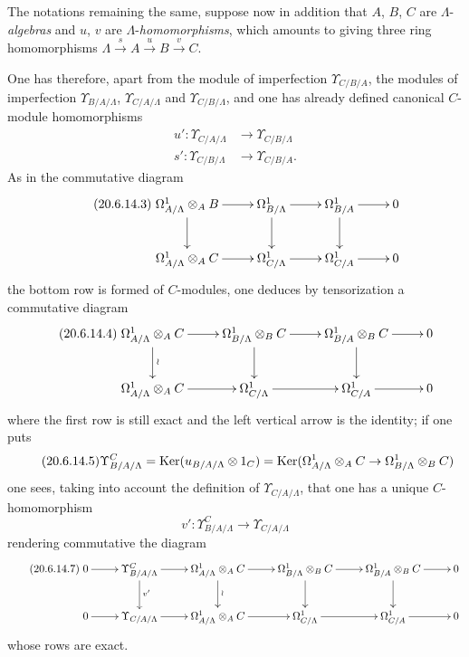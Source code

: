 \begin{env}[20.6.14]
\label{0.20.6.14}
The notations remaining the same, suppose now in addition that $A$, $B$, $C$ are $\Lambda$-\emph{algebras} and $u$, $v$ are $\Lambda$-\emph{homomorphisms}, which amounts to giving three ring homomorphisms $\Lambda\xrightarrow{s}A\xrightarrow{u}B\xrightarrow{v}C$.

One has therefore, apart from the module of imperfection $\Upsilon_{C/B/A}$, the modules of imperfection $\Upsilon_{B/A/\Lambda}$, $\Upsilon_{C/A/\Lambda}$ and $\Upsilon_{C/B/\Lambda}$, and one has already defined canonical $C$-module homomorphisms 
\begin{align}
\tag{20.6.14.1}
  \label{0.20.6.14.1}
  u':\Upsilon_{C/A/\Lambda}&\to\Upsilon_{C/B/\Lambda} \\
\tag{20.6.14.2}
  \label{0.20.6.14.2}
  s':\Upsilon_{C/B/\Lambda}&\to\Upsilon_{C/B/A}.
\end{align}
As in the commutative diagram 
\begin{equation}
\tag{20.6.14.3}
  \label{0.20.6.14.3}
\xymatrix{
  \Omega^1_{A/\Lambda}\otimes_A B \ar[r] \ar[d] & \Omega^1_{B/\Lambda} \ar[r] \ar[d] & \Omega^1_{B/A} \ar[r] \ar[d] & 0 \\
  \Omega^1_{A/\Lambda}\otimes_A C \ar[r] & \Omega^1_{C/\Lambda} \ar[r] & \Omega^1_{C/A} \ar[r] & 0
}
\end{equation}
the bottom row is formed of $C$-modules, one deduces by tensorization a commutative diagram
\begin{equation}
\tag{20.6.14.4}
  \label{0.20.6.14.4}
\xymatrix{
  \Omega^1_{A/\Lambda}\otimes_A C \ar[r] \ar[d]^{\wr} & \Omega^1_{B/\Lambda}\otimes_B C \ar[r] \ar[d] & \Omega^1_{B/A}\otimes_B C \ar[r] \ar[d] & 0 \\
  \Omega^1_{A/\Lambda}\otimes_A C \ar[r] & \Omega^1_{C/\Lambda} \ar[r] & \Omega^1_{C/A} \ar[r] & 0
}
\end{equation}
where the first row is still exact and the left vertical arrow is the identity; if one puts
\begin{equation}
\tag{20.6.14.5}
  \label{0.20.6.14.5}
  \Upsilon^C_{B/A/\Lambda}=\operatorname{Ker}(u_{B/A/\Lambda}\otimes 1_C)=\operatorname{Ker}(\Omega^1_{A/\Lambda}\otimes_A C\to\Omega^1_{B/\Lambda}\otimes_B C)
\end{equation}
one sees, taking into account the definition of $\Upsilon_{C/A/\Lambda}$, that one has a unique $C$-homomorphism
\begin{equation}
\tag{20.6.14.6}
  \label{0.20.6.14.6}
  v':\Upsilon^C_{B/A/\Lambda}\to\Upsilon_{C/A/\Lambda}
\end{equation}
rendering commutative the diagram
\begin{equation}
\tag{20.6.14.7}
  \label{0.20.6.14.7}
\xymatrix{
  0 \ar[r] & \Upsilon^C_{B/A/\Lambda} \ar[r] \ar[d]^{v'} & \Omega^1_{A/\Lambda}\otimes_A C \ar[r] \ar[d]^{\wr} & \Omega^1_{B/\Lambda}\otimes_B C \ar[r] \ar[d] & \Omega^1_{B/A}\otimes_B C \ar[r] \ar[d] & 0 \\
  0 \ar[r] & \Upsilon_{C/A/\Lambda} \ar[r] & \Omega^1_{A/\Lambda}\otimes_A C \ar[r] & \Omega^1_{C/\Lambda} \ar[r] & \Omega^1_{C/A} \ar[r] & 0
}
\end{equation}
whose rows are exact.


\end{env}
